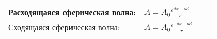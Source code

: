 \documentclass{article}
\begin{document}
\begin{tabular}{ |p{4.1cm}|p{5.4cm}|p{4.1cm}|p{4.4cm}|  }
\hline
Расходящаяся сферическая волна:                                              &  %
$A = A_0 \frac{e^{i k r-i \omega t}}{r}$                                     &  %
                                                                             &  %
                                                                             \\ %
\hline
Сходящаяся сферическая волна:                                                &  %
$A = A_0 \frac{e^{-i k r-i \omega t}}{r}$                                    &  %
                                                                             &  %
                                                                             \\ %
\hline
\end{tabular}

\newpage
\end{document}
